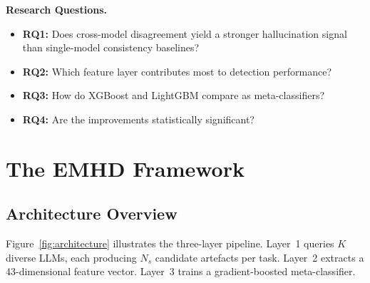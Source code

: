 \documentclass[11pt,a4paper]{article}
\begin{document}
\noindent\textbf{Research Questions.}
\begin{itemize}
\item \textbf{RQ1:} Does cross-model disagreement yield a stronger hallucination signal than single-model consistency baselines?
\item \textbf{RQ2:} Which feature layer contributes most to detection performance?
\item \textbf{RQ3:} How do XGBoost and LightGBM compare as meta-classifiers?
\item \textbf{RQ4:} Are the improvements statistically significant?
\end{itemize}


\section{The EMHD Framework}
\label{sec:method}

\subsection{Architecture Overview}

Figure~\ref{fig:architecture} illustrates the three-layer pipeline. Layer~1 queries $K$ diverse LLMs, each producing $N_s$ candidate artefacts per task. Layer~2 extracts a 43-dimensional feature vector. Layer~3 trains a gradient-boosted meta-classifier.
\end{document}
